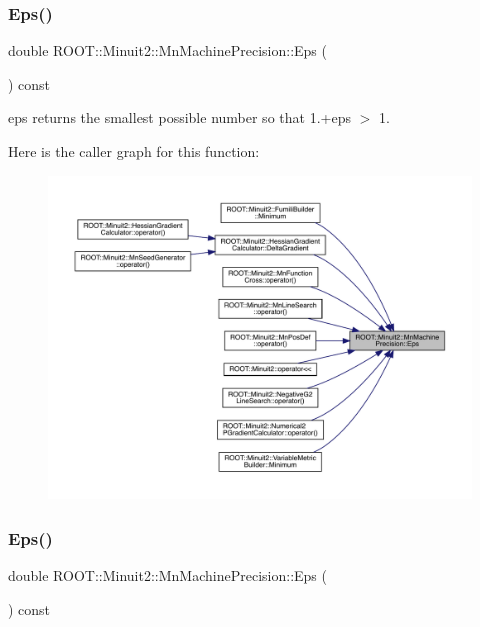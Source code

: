 \subsubsection{\texorpdfstring{Eps()}{Eps()}\hspace{0.1cm}{\footnotesize\ttfamily [1/3]}}
{\footnotesize\ttfamily double R\+O\+O\+T\+::\+Minuit2\+::\+Mn\+Machine\+Precision\+::\+Eps (\begin{DoxyParamCaption}{ }\end{DoxyParamCaption}) const\hspace{0.3cm}{\ttfamily [inline]}}



eps returns the smallest possible number so that 1.+eps $>$ 1. 

Here is the caller graph for this function\+:
\nopagebreak
\begin{figure}[H]
\begin{center}
\leavevmode
\includegraphics[width=350pt]{d4/d40/classROOT_1_1Minuit2_1_1MnMachinePrecision_a3a56da6043c5df1a98e5c8b1aa9f6d9f_icgraph}
\end{center}
\end{figure}
\mbox{\label{classROOT_1_1Minuit2_1_1MnMachinePrecision_a3a56da6043c5df1a98e5c8b1aa9f6d9f}} 
\subsubsection{\texorpdfstring{Eps()}{Eps()}\hspace{0.1cm}{\footnotesize\ttfamily [2/3]}}
{\footnotesize\ttfamily double R\+O\+O\+T\+::\+Minuit2\+::\+Mn\+Machine\+Precision\+::\+Eps (\begin{DoxyParamCaption}{ }\end{DoxyParamCaption}) const\hspace{0.3cm}{\ttfamily [inline]}}



